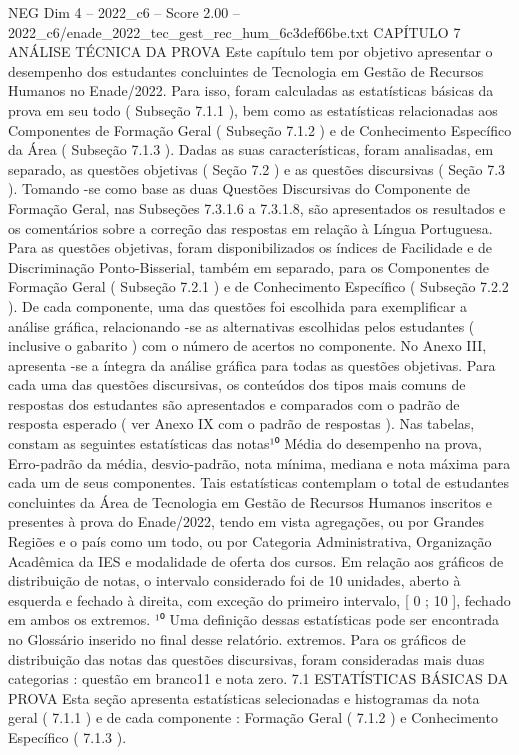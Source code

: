 \begin{textsample}{NEG Dim 4 – 2022\_c6 – Score 2.00 – 2022\_c6/enade\_2022\_tec\_gest\_rec\_hum\_6c3def66be.txt}  \label{ex:f4_neg_271}
CAPÍTULO 7 ANÁLISE TÉCNICA DA PROVA Este capítulo tem por objetivo apresentar o desempenho dos estudantes concluintes de Tecnologia em Gestão de Recursos Humanos no Enade/2022.
Para isso, foram calculadas as estatísticas básicas da prova em seu todo ( Subseção 7.1.1 ), bem como as estatísticas relacionadas aos Componentes de Formação Geral ( Subseção 7.1.2 ) e de Conhecimento Específico da Área ( Subseção 7.1.3 ).
Dadas as suas características, foram analisadas, em separado, as questões objetivas ( Seção 7.2 ) e as questões discursivas ( Seção 7.3 ).
Tomando -se como base as duas Questões Discursivas do Componente de Formação Geral, nas Subseções 7.3.1.6 a 7.3.1.8, são apresentados os resultados e os comentários sobre a correção das respostas em relação à Língua Portuguesa.
Para as questões objetivas, foram disponibilizados os índices de Facilidade e de Discriminação Ponto-Bisserial, também em separado, para os Componentes de Formação Geral ( Subseção 7.2.1 ) e de Conhecimento Específico ( Subseção 7.2.2 ).
De cada componente, uma das questões foi escolhida para exemplificar a análise gráfica, relacionando -se as alternativas escolhidas pelos estudantes ( inclusive o gabarito ) com o número de acertos no componente.
No Anexo III, apresenta -se a íntegra da análise gráfica para todas as questões objetivas.
Para cada uma das questões discursivas, os conteúdos dos tipos mais comuns de respostas dos estudantes são apresentados e comparados com o padrão de resposta esperado ( ver Anexo IX com o padrão de respostas ).
Nas tabelas, constam as seguintes estatísticas das notas¹⁰ Média do desempenho na prova, Erro-padrão da média, desvio-padrão, nota mínima, mediana e nota máxima para cada um de seus componentes.
Tais estatísticas contemplam o total de estudantes concluintes da Área de Tecnologia em Gestão de Recursos Humanos inscritos e presentes à prova do Enade/2022, tendo em vista agregações, ou por Grandes Regiões e o país como um todo, ou por Categoria Administrativa, Organização Acadêmica da IES e modalidade de oferta dos cursos.
Em relação aos gráficos de distribuição de notas, o intervalo considerado foi de 10 unidades, aberto à esquerda e fechado à direita, com exceção do primeiro intervalo, [ 0 ; 10 ], fechado em ambos os extremos. ¹⁰ Uma definição dessas estatísticas pode ser encontrada no Glossário inserido no final desse relatório. extremos.
Para os gráficos de distribuição das notas das questões discursivas, foram consideradas mais duas categorias : questão em branco11 e nota zero. 7.1 ESTATÍSTICAS BÁSICAS DA PROVA Esta seção apresenta estatísticas selecionadas e histogramas da nota geral ( 7.1.1 ) e de cada componente : Formação Geral ( 7.1.2 ) e Conhecimento Específico ( 7.1.3 ).

\end{textsample}
